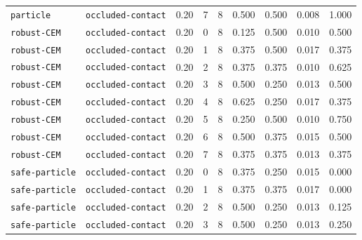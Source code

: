 \documentclass{article}
\begin{document}
\begin{center}
\begin{tabular}{llccccccc}
\texttt{particle} & \texttt{occluded-contact} & 0.20 & 7 & 8 & 0.500 & 0.500 & 0.008 & 1.000 \\
\texttt{robust-CEM} & \texttt{occluded-contact} & 0.20 & 0 & 8 & 0.125 & 0.500 & 0.010 & 0.500 \\
\texttt{robust-CEM} & \texttt{occluded-contact} & 0.20 & 1 & 8 & 0.375 & 0.500 & 0.017 & 0.375 \\
\texttt{robust-CEM} & \texttt{occluded-contact} & 0.20 & 2 & 8 & 0.375 & 0.375 & 0.010 & 0.625 \\
\texttt{robust-CEM} & \texttt{occluded-contact} & 0.20 & 3 & 8 & 0.500 & 0.250 & 0.013 & 0.500 \\
\texttt{robust-CEM} & \texttt{occluded-contact} & 0.20 & 4 & 8 & 0.625 & 0.250 & 0.017 & 0.375 \\
\texttt{robust-CEM} & \texttt{occluded-contact} & 0.20 & 5 & 8 & 0.250 & 0.500 & 0.010 & 0.750 \\
\texttt{robust-CEM} & \texttt{occluded-contact} & 0.20 & 6 & 8 & 0.500 & 0.375 & 0.015 & 0.500 \\
\texttt{robust-CEM} & \texttt{occluded-contact} & 0.20 & 7 & 8 & 0.375 & 0.375 & 0.013 & 0.375 \\
\texttt{safe-particle} & \texttt{occluded-contact} & 0.20 & 0 & 8 & 0.375 & 0.250 & 0.015 & 0.000 \\
\texttt{safe-particle} & \texttt{occluded-contact} & 0.20 & 1 & 8 & 0.375 & 0.375 & 0.017 & 0.000 \\
\texttt{safe-particle} & \texttt{occluded-contact} & 0.20 & 2 & 8 & 0.500 & 0.250 & 0.013 & 0.125 \\
\texttt{safe-particle} & \texttt{occluded-contact} & 0.20 & 3 & 8 & 0.500 & 0.250 & 0.013 & 0.250 \\
\bottomrule
\end{tabular}
\end{center}
\end{document}
